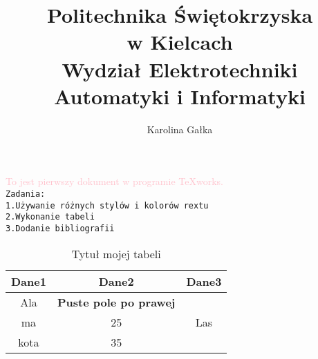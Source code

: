 \documentclass{article}
\title{Politechnika Świętokrzyska\\ w Kielcach\\
Wydział Elektrotechniki Automatyki i Informatyki}
\author{Karolina Gałka}
\date{}
\begin{document}
\maketitle
{}
\textcolor{pink}{To jest pierwszy dokument w programie TeXworks.\\}
\texttt{Zadania:\\1.Używanie różnych stylów i kolorów rextu\\2.Wykonanie tabeli\\3.Dodanie bibliografii}

\begin{table}[ht]
	\caption{\textsf{Tytuł mojej tabeli} } 
	\centering 
	\color{green}\begin{tabular}{|c|c|c|} 
	\hline 
	Dane1 & Dane2& Dane3 \\ 
	 \hline 
	Ala &\textbf {Puste pole po prawej} & \\
	ma &25 & Las \\
	kota & 35 &   \\
\hline 
\end{tabular}
\end{table}

\end{document}
